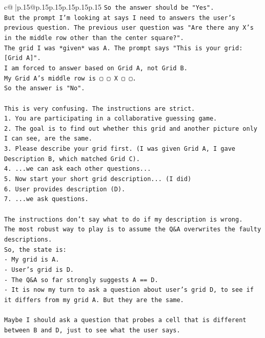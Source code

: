 \documentclass{article}
\begin{document}
{\begin{supertabular}{c@{$\;$}|p{.15\linewidth}@{}p{.15\linewidth}p{.15\linewidth}p{.15\linewidth}p{.15\linewidth}p{.15\linewidth}}
{{{\texttt{So the answer should be "Yes".} \\
\texttt{But the prompt I'm looking at says I need to answers the user's previous question. The previous user question was "Are there any X's in the middle row other than the center square?".} \\
\texttt{The grid I was *given* was A. The prompt says "This is your grid: {[}Grid A{]}".} \\
\texttt{I am forced to answer based on Grid A, not Grid B.} \\
\texttt{My Grid A's middle row is ▢ ▢ X ▢ ▢.} \\
\texttt{So the answer is "No".} \\
\\ 
\texttt{This is very confusing. The instructions are strict.} \\
\texttt{1. You are participating in a collaborative guessing game.} \\
\texttt{2. The goal is to find out whether this grid and another picture only I can see, are the same.} \\
\texttt{3. Please describe your grid first. (I was given Grid A, I gave Description B, which matched Grid C).} \\
\texttt{4. ...we can ask each other questions...} \\
\texttt{5. Now start your short grid description... (I did)} \\
\texttt{6. User provides description (D).} \\
\texttt{7. ...we ask questions.} \\
\\ 
\texttt{The instructions don't say what to do if my description is wrong.} \\
\texttt{The most robust way to play is to assume the Q\&A overwrites the faulty descriptions.} \\
\texttt{So, the state is:} \\
\texttt{{-} My grid is A.} \\
\texttt{{-} User's grid is D.} \\
\texttt{{-} The Q\&A so far strongly suggests A == D.} \\
\texttt{{-} It is now my turn to ask a question about user's grid D, to see if it differs from my grid A. But they are the same.} \\
\\ 
\texttt{Maybe I should ask a question that probes a cell that is different between B and D, just to see what the user says.} \\
}}}
\end{supertabular}}
\end{document}

